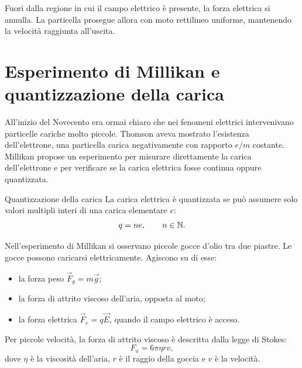 \documentclass[a4paper]{article}
\begin{document}
Fuori dalla regione in cui il campo elettrico è presente, la forza elettrica si annulla. La particella prosegue allora con moto rettilineo uniforme, mantenendo la velocità raggiunta all'uscita.

\section{Esperimento di Millikan e quantizzazione della carica}

All'inizio del Novecento era ormai chiaro che nei fenomeni elettrici intervenivano particelle cariche molto piccole. Thomson aveva mostrato l'esistenza dell'elettrone, una particella carica negativamente con rapporto \(e/m\) costante. Millikan propose un esperimento per misurare direttamente la carica dell'elettrone e per verificare se la carica elettrica fosse continua oppure quantizzata.

\begin{snippetdefinition}{Quantizzazione della carica}
    La carica elettrica è quantizzata se può assumere solo valori multipli interi di una carica elementare \(e\):
    \[
        q=ne,
        \qquad
        n\in\mathbb{N}.
    \]
\end{snippetdefinition}

Nell'esperimento di Millikan si osservano piccole gocce d'olio tra due piastre. Le gocce possono caricarsi elettricamente. Agiscono su di esse:
\begin{itemize}
    \item la forza peso \(\vec{F}_g=m\vec{g}\);
    \item la forza di attrito viscoso dell'aria, opposta al moto;
    \item la forza elettrica \(\vec{F}_e=q\vec{E}\), quando il campo elettrico è acceso.
\end{itemize}

Per piccole velocità, la forza di attrito viscoso è descritta dalla legge di Stokes:
\[
    F_a=6\pi\eta rv,
\]
dove \(\eta\) è la viscosità dell'aria, \(r\) è il raggio della goccia e \(v\) è la velocità.

\begin{center}
\end{center}
\end{document}
